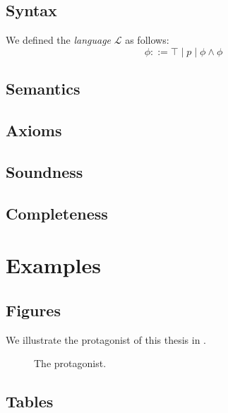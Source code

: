 \documentclass[titlepage,a4paper,11pt]{report}
\begin{document}
\lipsum[15]

\section{Syntax}

\begin{definition}\label{def:lang}
We defined the \emph{language} $\mathcal{L}$ as follows:
  \[
    \phi ::= \top \mid p \mid \phi \land \phi
  \]
\end{definition}

\lipsum[21]

\section{Semantics}

\section{Axioms}

\section{Soundness}

\section{Completeness}

\chapter{Examples}

\section{Figures}

We illustrate the protagonist of this thesis in .

\begin{figure}[H]
  \centering
  \caption{The protagonist.}\label{fig:drawing}
\end{figure}

\section{Tables}
\end{document}
